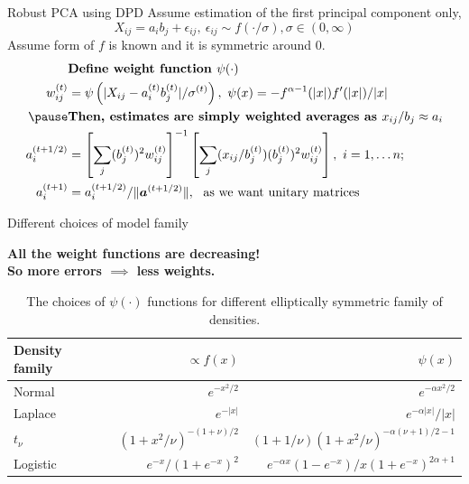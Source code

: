 \documentclass[10pt]{beamer}
\newcommand{\bb}[1]{\boldsymbol{#1}}
\begin{document}
\begin{frame}{Robust PCA using DPD}
    Assume estimation of the first principal component only,
    \begin{equation*}
        X_{ij} = a_i b_j + \epsilon_{ij}, \ \epsilon_{ij} \sim f(\cdot / \sigma), \sigma \in (0, \infty)
    \end{equation*}
    \noindent Assume form of $f$ is known and it is symmetric around $0$. 
    \pause 
    \begin{align*}
        & \textbf{Define weight function }\psi(\cdot)\\
        w_{ij}^{(t)} & = \psi\left( \vert X_{ij} - a_i^{(t)}b_{j}^{(t)} \vert / \sigma^{(t)}  \right), \ \psi(x) = -f^{\alpha-1}(\vert x\vert)f'(\vert x\vert) / \vert x\vert \\
        \pause
        & \textbf{Then, estimates are simply weighted averages as } x_{ij}/b_j \approx a_i \\
        a_i^{(t+1/2)} & = \left[ \sum_j (b_j^{(t)})^2 w_{ij}^{(t)} \right]^{-1} \left[ \sum_j (x_{ij} / b_j^{(t)}) (b_j^{(t)})^2 w_{ij}^{(t)} \right], \ i = 1, \ldots n; \\
        a_i^{(t+1)} & = a_i^{(t + 1/2)} / \Vert \bb{a}^{(t + 1/2)} \Vert, \ \text{ as we want unitary matrices} 
    \end{align*}
\end{frame}

\begin{frame}{Different choices of model family}

{
    \textbf{All the weight functions are decreasing!}\\
    \textbf{So more errors $\implies$ less weights.}
}

\begin{table}
    \centering
    \begin{tabular}{lrr}
        \toprule
        \textbf{Density family} & $\propto f(x)$ & $\psi(x)$ \\
        \midrule
         Normal & $e^{-x^2/2}$ & $e^{-\alpha x^2/2}$ \\
         Laplace & $e^{-\vert x\vert}$ & $e^{-\alpha\vert x\vert}/\vert x\vert$ \\
         $t_\nu$ & $(1+x^2/\nu)^{-(1+\nu)/2}$ & $(1 + 1/\nu)(1 + x^2/\nu)^{-\alpha(\nu + 1)/2 - 1}$\\
         Logistic & $e^{-x}/(1+e^{-x})^2$ & $e^{-\alpha x}(1 - e^{-x})/x(1+e^{-x})^{2\alpha + 1}$\\
         \bottomrule
    \end{tabular}
    \caption{The choices of $\psi(\cdot)$ functions for different elliptically symmetric family of densities.}
    \label{tab:rpca-psi-and-g}
\end{table}
\end{frame}
\end{document}
